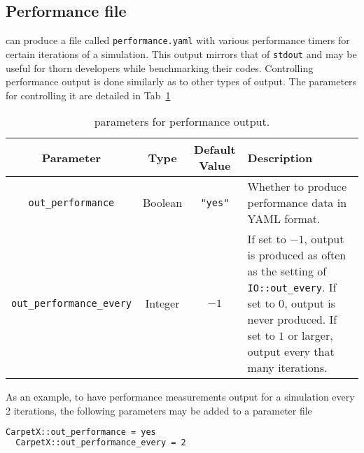 \subsection{Performance file}

\CarpetX\space can produce a file called \texttt{performance.yaml} with various performance timers for certain iterations of a simulation. This output mirrors that of \texttt{stdout} and may be useful for thorn developers while benchmarking their codes. Controlling performance output is done similarly as to other types of output. The parameters for controlling it are detailed in Tab~\ref{tab:perf_output}

\begin{table}[ht]
  \centering
  \begin{tabularx}{\textwidth}{cccX}
    Parameter                       & Type     & Default Value  & Description \\\hline\hline
    \texttt{out\_performance}        & Boolean & \texttt{"yes"} & Whether to produce performance data in YAML format. \\
    \texttt{out\_performance\_every} & Integer & $-1$           & If set to $-1$, output is produced as often as the setting of \texttt{IO::out\_every}. If set to $0$, output is never produced. If set to $1$ or larger, output every that many iterations. \\\hline\hline
  \end{tabularx}
  \label{tab:perf_output}
  \caption{\CarpetX\space parameters for performance output.}
\end{table}

As an example, to  have performance measurements output for a simulation every 2 iterations, the following parameters may be added to a parameter file

\begin{lstlisting}[language=bash]
  CarpetX::out_performance = yes  
  CarpetX::out_performance_every = 2
\end{lstlisting}

